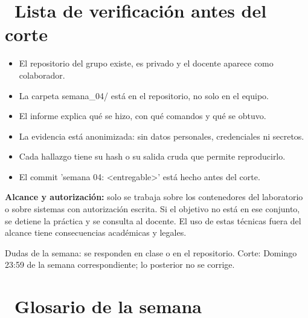 \documentclass[11pt,a4paper]{article}
\newcommand{\iconotexto}[2]{\textcolor{cyanNeon}{\faIcon{#1}}~#2}
\begin{document}
\section{\iconotexto{clipboard-check}{Lista de verificación antes del corte}}

\begin{itemize}[leftmargin=1.4em,itemsep=2pt,topsep=3pt]
  \item El repositorio del grupo existe, es privado y el docente aparece como colaborador.
  \item La carpeta semana\_04/ está en el repositorio, no solo en el equipo.
  \item El informe explica qué se hizo, con qué comandos y qué se obtuvo.
  \item La evidencia está anonimizada: sin datos personales, credenciales ni secretos.
  \item Cada hallazgo tiene su hash o su salida cruda que permite reproducirlo.
  \item El commit 'semana 04: \textless{}entregable\textgreater{}' está hecho antes del corte.
\end{itemize}

\begin{tcolorbox}[cajaMejora]\textbf{Alcance y autorización:} solo se trabaja sobre los contenedores del laboratorio o sobre sistemas con autorización escrita. Si el objetivo no está en ese conjunto, se detiene la práctica y se consulta al docente. El uso de estas técnicas fuera del alcance tiene consecuencias académicas y legales.
\end{tcolorbox}

\begin{cajaRecuerda}Dudas de la semana: se responden en clase o en el repositorio. Corte: Domingo 23:59 de la semana correspondiente; lo posterior no se corrige.
\end{cajaRecuerda}

\clearpage

\section{\iconotexto{book}{Glosario de la semana}}
\end{document}
